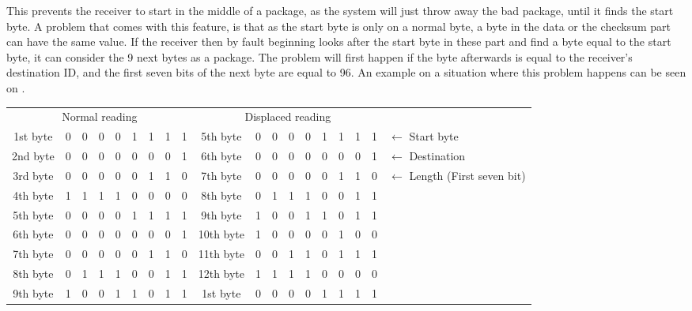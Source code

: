 This prevents the receiver to start in the middle of a package, as the system will just throw away the bad package, until it finds the start byte. A problem that comes with this feature, is that as the start byte is only on a normal byte, a byte in the data or the checksum part can have the same value. If the receiver then by fault beginning looks after the start byte in these part and find a byte equal to the start byte, it can consider the 9 next bytes as a package. The problem will first happen if the byte afterwards is equal to the receiver's destination ID, and the first seven bits of the next byte are equal to 96. An example on a situation where this problem happens can be seen on .

\begin{table}[H]
\centering
\begin{tabular}{c | m{0.1cm} m{0.1cm} m{0.1cm} m{0.1cm} m{0.1cm} m{0.1cm} m{0.1cm} m{0.1cm} | c | m{0.1cm} m{0.1cm} m{0.1cm} m{0.1cm} m{0.1cm} m{0.1cm} m{0.1cm} m{0.1cm} | l }
\multicolumn{9}{c}{Normal reading} & \multicolumn{9}{c}{Displaced reading} &  \\
\cline{2-9} \cline{11-18}
1st byte & 0 & 0 & 0 & 0 & 1 & 1 & 1 & 1 & 5th byte & 0 & 0 & 0 & 0 & 1 & 1 & 1 & 1 & $\leftarrow$ Start byte \\
\cline{2-9} \cline{11-18}
2nd byte & 0 & 0 & 0 & 0 & 0 & 0 & 0 & 1 & 6th byte & 0 & 0 & 0 & 0 & 0 & 0 & 0 & 1 & $\leftarrow$ Destination \\
\cline{2-9} \cline{11-18}
3rd byte & 0 & 0 & 0 & 0 & 0 & 1 & 1 & 0 & 7th byte & 0 & 0 & 0 & 0 & 0 & 1 & 1 & 0 & $\leftarrow$ Length (First seven bit)\\
\cline{2-9} \cline{11-18}
4th byte & 1 & 1 & 1 & 1 & 0 & 0 & 0 & 0 & 8th byte & 0 & 1 & 1 & 1 & 0 & 0 & 1 & 1 & \\
\cline{2-9} \cline{11-18}
5th byte & 0 & 0 & 0 & 0 & 1 & 1 & 1 & 1 & 9th byte & 1 & 0 & 0 & 1 & 1 & 0 & 1 & 1 & \\
\cline{2-9} \cline{11-18}
6th byte & 0 & 0 & 0 & 0 & 0 & 0 & 0 & 1 & 10th byte & 1 & 0 & 0 & 0 & 0 & 1 & 0 & 0 & \\
\cline{2-9} \cline{11-18}
7th byte & 0 & 0 & 0 & 0 & 0 & 1 & 1 & 0 & 11th byte & 0 & 0 & 1 & 1 & 0 & 1 & 1 & 1 & \\
\cline{2-9} \cline{11-18}
8th byte & 0 & 1 & 1 & 1 & 0 & 0 & 1 & 1 & 12th byte & 1 & 1 & 1 & 1 & 0 & 0 & 0 & 0 & \\
\cline{2-9} \cline{11-18}
9th byte & 1 & 0 & 0 & 1 & 1 & 0 & 1 & 1 & 1st byte & 0 & 0 & 0 & 0 & 1 & 1 & 1 & 1 & \\

\end{tabular}
\end{table}
